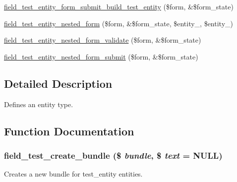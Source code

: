 \begin{DoxyCompactItemize}
\item 
\hyperlink{field__test_8entity_8inc_aee4f6831ba19841da21548d86406db01}{field\_\-test\_\-entity\_\-form\_\-submit\_\-build\_\-test\_\-entity} (\$form, \&\$form\_\-state)
\item 
\hyperlink{field__test_8entity_8inc_a8161d4c3065234379c6d6379ad71afbd}{field\_\-test\_\-entity\_\-nested\_\-form} (\$form, \&\$form\_\-state, \$entity\_, \$entity\_)
\item 
\hyperlink{field__test_8entity_8inc_a526966c6b74e25b6a5aa0b283f6a35a7}{field\_\-test\_\-entity\_\-nested\_\-form\_\-validate} (\$form, \&\$form\_\-state)
\item 
\hyperlink{field__test_8entity_8inc_a2610999ccc4c08b9dc7c4ab45d1db366}{field\_\-test\_\-entity\_\-nested\_\-form\_\-submit} (\$form, \&\$form\_\-state)
\end{DoxyCompactItemize}


\subsection{Detailed Description}
Defines an entity type. 

\subsection{Function Documentation}
\hypertarget{field__test_8entity_8inc_ab01b42bea066a819706c3034fffa5f7b}{
\subsubsection[{field\_\-test\_\-create\_\-bundle}]{\setlength{\rightskip}{0pt plus 5cm}field\_\-test\_\-create\_\-bundle (\$ {\em bundle}, \/  \$ {\em text} = {\ttfamily NULL})}}
\label{field__test_8entity_8inc_ab01b42bea066a819706c3034fffa5f7b}
Creates a new bundle for test\_\-entity entities.


